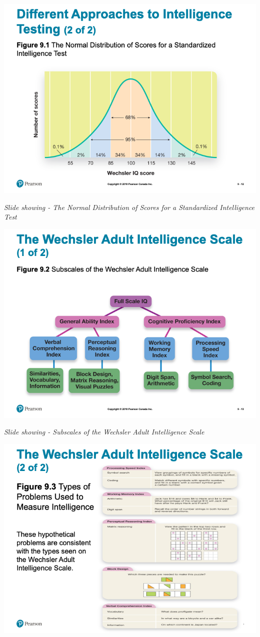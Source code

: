 \documentclass[
]{book}
\begin{document}
\begin{reflect}
\includegraphics{assets/unit_2/slide_12.png}

\emph{Slide showing - The Normal Distribution of Scores for a Standardized Intelligence Test}

\includegraphics{assets/unit_2/slide_13.png}

\emph{Slide showing - Subscales of the Wechsler Adult Intelligence Scale}

\includegraphics{assets/unit_2/slide_14.png}


\end{reflect}
\end{document}
